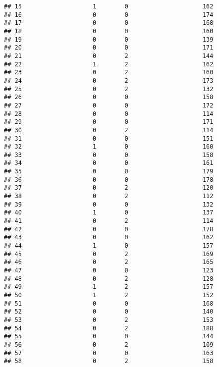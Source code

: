 \documentclass[]{article}
\begin{document}
\begin{verbatim}
## 15                    1        0                     162
## 16                    0        0                     174
## 17                    0        0                     168
## 18                    0        0                     160
## 19                    0        0                     139
## 20                    0        0                     171
## 21                    0        2                     144
## 22                    1        2                     162
## 23                    0        2                     160
## 24                    0        2                     173
## 25                    0        2                     132
## 26                    0        0                     158
## 27                    0        0                     172
## 28                    0        0                     114
## 29                    0        0                     171
## 30                    0        2                     114
## 31                    0        0                     151
## 32                    1        0                     160
## 33                    0        0                     158
## 34                    0        0                     161
## 35                    0        0                     179
## 36                    0        0                     178
## 37                    0        2                     120
## 38                    0        2                     112
## 39                    0        0                     132
## 40                    1        0                     137
## 41                    0        2                     114
## 42                    0        0                     178
## 43                    0        0                     162
## 44                    1        0                     157
## 45                    0        2                     169
## 46                    0        2                     165
## 47                    0        0                     123
## 48                    0        2                     128
## 49                    1        2                     157
## 50                    1        2                     152
## 51                    0        0                     168
## 52                    0        0                     140
## 53                    0        2                     153
## 54                    0        2                     188
## 55                    0        0                     144
## 56                    0        2                     109
## 57                    0        0                     163
## 58                    0        2                     158

\end{verbatim}
\end{document}
